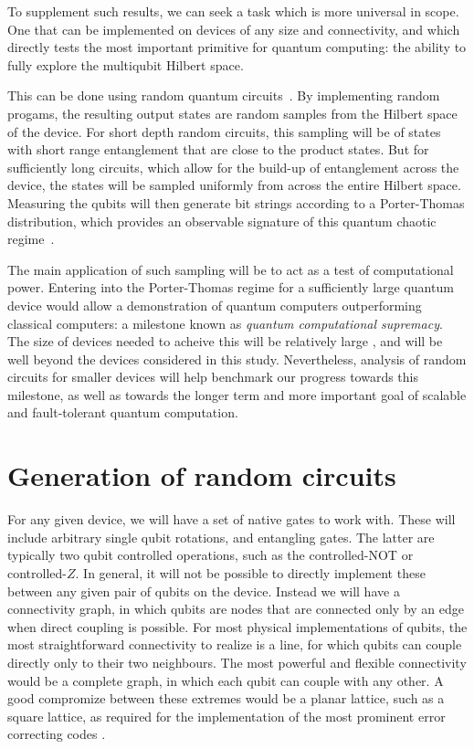 \documentclass[aps,prl,twocolumn,showpacs,preprintnumbers]{revtex4-1}
\begin{document}
To supplement such results, we can seek a task which is more universal in scope. One that can be implemented on devices of any size and connectivity, and which directly tests the most important primitive for quantum computing: the ability to fully explore the multiqubit Hilbert space.

This can be done using random quantum circuits~\cite{boixo:18}. By implementing random progams, the resulting output states are random samples from the Hilbert space of the device. For short depth random circuits, this sampling will be of states with short range entanglement that are close to the product states. But for sufficiently long circuits, which allow for the build-up of entanglement across the device, the states will be sampled uniformly from across the entire Hilbert space. Measuring the qubits will then generate bit strings according to a Porter-Thomas distribution, which provides an observable signature of this quantum chaotic regime~\cite{boixo:18}.

The main application of such sampling will be to act as a test of computational power. Entering into the Porter-Thomas regime for a sufficiently large quantum device would allow a demonstration of quantum computers outperforming classical computers: a milestone known as \textit{quantum computational supremacy}. The size of devices needed to acheive this will be relatively large \cite{}, and will be well beyond the devices considered in this study. Nevertheless, analysis of random circuits for smaller devices will help benchmark our progress towards this milestone, as well as towards the longer term and more important goal of scalable and fault-tolerant quantum computation.


\section{Generation of random circuits}

For any given device, we will have a set of native gates to work with. These will include arbitrary single qubit rotations, and entangling gates. The latter are typically two qubit controlled operations, such as the controlled-NOT or controlled-$Z$. In general, it will not be possible to directly implement these between any given pair of qubits on the device. Instead we will have a connectivity graph, in which qubits are nodes that are connected only by an edge when direct coupling is possible. For most physical implementations of qubits, the most straightforward connectivity to realize is a line, for which qubits can couple directly only to their two neighbours. The most powerful and flexible connectivity would be a complete graph, in which each qubit can couple with any other. A good compromize between these extremes would be a planar lattice, such as a square lattice, as required for the implementation of the most prominent error correcting codes \cite{}.
\end{document}
